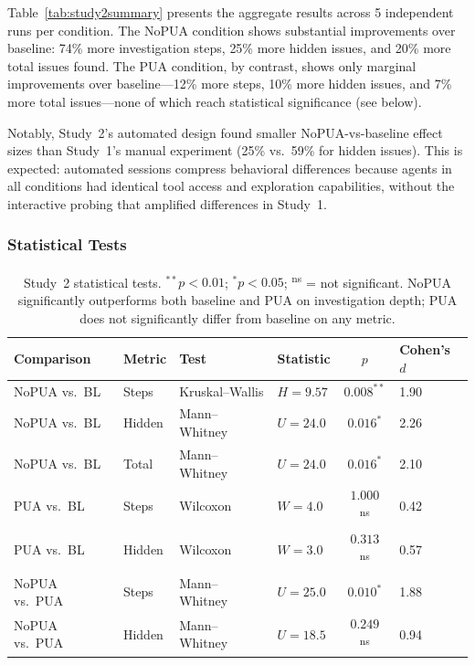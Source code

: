 \documentclass[11pt]{article}
\begin{document}
Table~\ref{tab:study2summary} presents the aggregate results across 5 independent runs per condition. The NoPUA condition shows substantial improvements over baseline: 74\% more investigation steps, 25\% more hidden issues, and 20\% more total issues found. The PUA condition, by contrast, shows only marginal improvements over baseline---12\% more steps, 10\% more hidden issues, and 7\% more total issues---none of which reach statistical significance (see below).

Notably, Study~2's automated design found smaller NoPUA-vs-baseline effect sizes than Study~1's manual experiment (25\% vs.\ 59\% for hidden issues). This is expected: automated sessions compress behavioral differences because agents in all conditions had identical tool access and exploration capabilities, without the interactive probing that amplified differences in Study~1.

\subsubsection{Statistical Tests}

\begin{table}[t]
\centering
\small
\begin{tabular}{@{}llllcl@{}}
\toprule
\textbf{Comparison} & \textbf{Metric} & \textbf{Test} & \textbf{Statistic} & \textbf{$p$} & \textbf{Cohen's $d$} \\
\midrule
NoPUA vs.\ BL & Steps & Kruskal--Wallis & $H = 9.57$ & $0.008^{**}$ & 1.90 \\
NoPUA vs.\ BL & Hidden & Mann--Whitney & $U = 24.0$ & $0.016^{*}$ & 2.26 \\
NoPUA vs.\ BL & Total & Mann--Whitney & $U = 24.0$ & $0.016^{*}$ & 2.10 \\
\midrule
PUA vs.\ BL & Steps & Wilcoxon & $W = 4.0$ & $1.000$ \textsuperscript{ns} & 0.42 \\
PUA vs.\ BL & Hidden & Wilcoxon & $W = 3.0$ & $0.313$ \textsuperscript{ns} & 0.57 \\
\midrule
NoPUA vs.\ PUA & Steps & Mann--Whitney & $U = 25.0$ & $0.010^{*}$ & 1.88 \\
NoPUA vs.\ PUA & Hidden & Mann--Whitney & $U = 18.5$ & $0.249$ \textsuperscript{ns} & 0.94 \\
\bottomrule
\end{tabular}
\caption{Study~2 statistical tests. $^{**}p < 0.01$; $^{*}p < 0.05$; \textsuperscript{ns} = not significant. NoPUA significantly outperforms both baseline and PUA on investigation depth; PUA does not significantly differ from baseline on any metric.}
\label{tab:study2stats}
\end{table}
\end{document}
